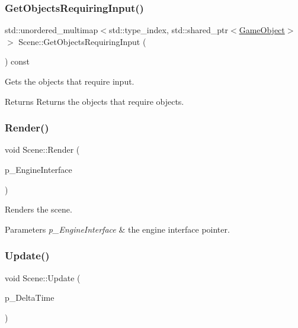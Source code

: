 \subsubsection{\texorpdfstring{GetObjectsRequiringInput()}{GetObjectsRequiringInput()}}
{\footnotesize\ttfamily std\+::unordered\+\_\+multimap$<$std\+::type\+\_\+index, std\+::shared\+\_\+ptr$<$\mbox{\hyperlink{class_game_object}{Game\+Object}}$>$ $>$ Scene\+::\+Get\+Objects\+Requiring\+Input (\begin{DoxyParamCaption}{ }\end{DoxyParamCaption}) const}



Gets the objects that require input. 

\begin{DoxyReturn}{Returns}
Returns the objects that require objects. 
\end{DoxyReturn}
\mbox{\label{class_scene_a5e11c2fe829f4a4143f5edfa71619aa7}} 
\subsubsection{\texorpdfstring{Render()}{Render()}}
{\footnotesize\ttfamily void Scene\+::\+Render (\begin{DoxyParamCaption}\item[{std\+::shared\+\_\+ptr$<$ \mbox{\hyperlink{class_i_engine_core}{I\+Engine\+Core}} $>$}]{p\+\_\+\+Engine\+Interface }\end{DoxyParamCaption})}



Renders the scene. 


\begin{DoxyParams}{Parameters}
{\em p\+\_\+\+Engine\+Interface} & the engine interface pointer. \\
\hline
\end{DoxyParams}
\mbox{\label{class_scene_a5783e29cf26164a26149d129242a42b6}} 
\subsubsection{\texorpdfstring{Update()}{Update()}}
{\footnotesize\ttfamily void Scene\+::\+Update (\begin{DoxyParamCaption}\item[{float}]{p\+\_\+\+Delta\+Time }\end{DoxyParamCaption})}



